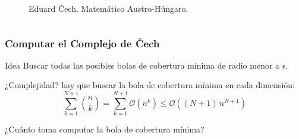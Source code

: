 \documentclass{beamer}
\newcommand{\OO}{\mathcal{O}}
\begin{document}
\begin{frame}
\begin{columns}
  \begin{figure}[H]
    \centering
    \caption{Eduard \v{C}ech. Matemático Austro-Húngaro.}
  \end{figure}
\end{columns}
\end{frame}

\begin{frame}\frametitle{Computar el Complejo de \v{C}ech}
\begin{block}{Idea}
  Buscar todas las posibles bolas de cobertura mínima de radio menor a \(\epsilon\).
\end{block}

\pause%
¿Complejidad? hay que buscar la bola de cobertura mínima en cada dimensión:
\begin{displaymath}
  \sum_{k=1}^{N+1} {n\choose k}
  =
  \sum_{k=1}^{N+1} \OO(n^k)
  \le
  \OO((N+1)\, n^{N+1})
\end{displaymath}

\pause%
¿Cuánto toma computar la bola de cobertura mínima?
\end{frame}
\end{document}
